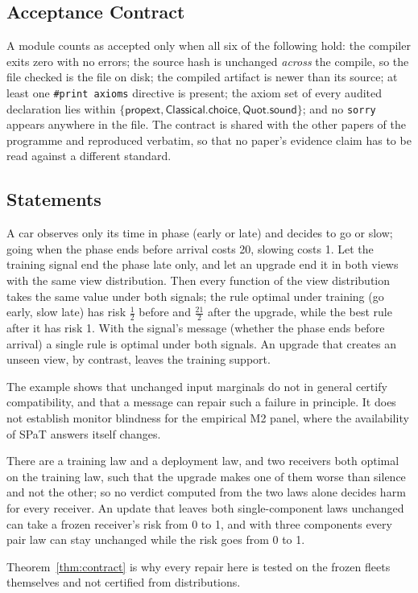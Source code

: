 \subsection{Acceptance Contract}
A module counts as accepted only when all six of the following hold: the compiler exits zero with no errors; the source hash is unchanged
\emph{across} the compile, so the file checked is the file on disk; the compiled artifact is newer than its source; at least one
\texttt{\#print axioms} directive is present; the axiom set of every audited declaration lies within
$\{\textsf{propext},\textsf{Classical.choice},\textsf{Quot.sound}\}$; and no \texttt{sorry} appears anywhere in the file. The contract is
shared with the other papers of the programme and reproduced verbatim, so that no paper's evidence claim has to be read against a
different standard.

\subsection{Statements}
\begin{theorem}\label{thm:blind}
A car observes only its time in phase (early or late) and decides to go or slow; going when the phase ends before arrival costs 20, slowing
costs 1. Let the training signal end the phase late only, and let an upgrade end it in both views with the same view distribution. Then
every function of the view distribution takes the same value under both signals; the rule optimal under training (go early, slow late) has
risk $\tfrac12$ before and $\tfrac{21}{2}$ after the upgrade, while the best rule after it has risk 1. With the signal's message (whether the
phase ends before arrival) a single rule is optimal under both signals. An upgrade that creates an unseen view, by contrast, leaves the
training support.
\end{theorem}
The example shows that unchanged input marginals do not in general certify compatibility, and that a message can repair such a failure
in principle. It does not establish monitor blindness for the empirical M2 panel, where the availability of SPaT answers itself changes.

\begin{theorem}\label{thm:contract}
There are a training law and a deployment law, and two receivers both optimal on the training law, such that the upgrade makes one of them
worse than silence and not the other; so no verdict computed from the two laws alone decides harm for every receiver. An update that leaves
both single-component laws unchanged can take a frozen receiver's risk from 0 to 1, and with three components every pair law can stay
unchanged while the risk goes from 0 to 1.
\end{theorem}
Theorem~\ref{thm:contract} is why every repair here is tested on the frozen fleets themselves and not certified from distributions.

